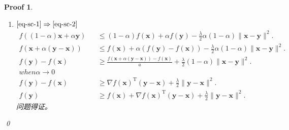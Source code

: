 \documentclass[a4paper,UTF8]{article}
\numberwithin{equation}{section}
\newtheorem*{myProof}{Proof}
\begin{document}
\begin{myProof}
\begin{enumerate}
\item[(2)]$\ref{eq-sc-1} \Rightarrow \ref{eq-sc-2}$\\
\begin{eqnarray*}
  f((1-\alpha)\mathbf{x} + \alpha\mathbf{y})
  &&\leq (1-\alpha)f(\mathbf{x}) + \alpha f(\mathbf{y}) 
  - \frac{\lambda}{2}\alpha(1-\alpha)\lVert \mathbf{x} - \mathbf{y}\rVert^2.\\
  f(\mathbf{x} + \alpha(\mathbf{y}-\mathbf{x}))
  &&\leq f(\mathbf{x}) + \alpha (f(\mathbf{y}) -f(\mathbf{x}))
  - \frac{\lambda}{2}\alpha(1-\alpha)\lVert \mathbf{x} - \mathbf{y}\rVert^2.\\
  f(\mathbf{y}) -f(\mathbf{x})
  &&\geq \frac{f(\mathbf{x} + \alpha(\mathbf{y}-\mathbf{x}))-f(\mathbf{x})}{a}
  +  \frac{\lambda}{2}(1-\alpha)\lVert \mathbf{x} - \mathbf{y}\rVert^2.\\
  when \alpha \rightarrow 0\\
  f(\mathbf{y}) -f(\mathbf{x})
  &&\geq \nabla f(\mathbf{x})^\mathrm{T}(\mathbf{y}-\mathbf{x}) 
  + \frac{\lambda}{2}\lVert \mathbf{y} - \mathbf{x}\rVert^2.\\
  f(\mathbf{y}) 
  &&\geq f(\mathbf{x}) 
  + \nabla f(\mathbf{x})^\mathrm{T}(\mathbf{y}-\mathbf{x}) 
  + \frac{\lambda}{2}\lVert \mathbf{y} - \mathbf{x}\rVert^2.
\end{eqnarray*}
问题得证。

\end{enumerate}
\qed
\end{myProof}


\newpage
\end{document}
